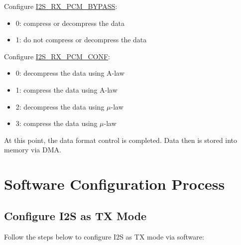 \documentclass[main\_\_EN.tex]{subfiles}
\begin{document}
Configure \hyperref[fielddesc:I2SRXPCMBYPASS]{I2S\_RX\_PCM\_BYPASS}:
\begin{itemize}
\item 0: compress or decompress the data
\item 1: do not compress or decompress the data
\end{itemize}
Configure \hyperref[fielddesc:I2SRXPCMCONF]{I2S\_RX\_PCM\_CONF}:
\begin{itemize}
\item 0: decompress the data using A-law
\item 1: compress the data using A-law
\item 2: decompress the data using $\mu$-law
\item 3: compress the data using $\mu$-law
\end{itemize}
At this point, the data format control is completed. Data then is stored into memory via DMA.

\section{Software Configuration Process}
\subsection{Configure I2S as TX Mode}\label{sec:i2s-configure-i2s-tx-mode}
Follow the steps below to configure I2S as TX mode via software:
\end{document}
